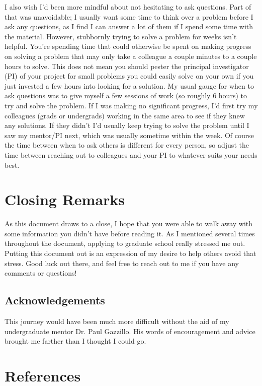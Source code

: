 \documentclass[12pt]{article}
\begin{document}
I also wish I'd been more mindful about not hesitating to ask questions. Part of that was unavoidable; I usually want some time to think over a problem before I ask any questions, as I find I can answer a lot of them if I spend some time with the material. However, stubbornly trying to solve a problem for weeks isn't helpful. You're spending time that could otherwise be spent on making progress on solving a problem that may only take a colleague a couple minutes to a couple hours to solve. This does not mean you should pester the principal investigator (PI) of your project for small problems you could easily solve on your own if you just invested a few hours into looking for a solution. My usual gauge for when to ask questions was to give myself a few sessions of work (so roughly 6 hours) to try and solve the problem. If I was making no significant progress, I'd first try my colleagues (grads or undergrads) working in the same area to see if they knew any solutions. If they didn't I'd usually keep trying to solve the problem until I saw my mentor/PI next, which was usually sometime within the week. Of course the time between when to ask others is different for every person, so adjust the time between reaching out to colleagues and your PI to whatever suits your needs best.

\section{Closing Remarks}

As this document draws to a close, I hope that you were able to walk away with some information you didn't have before reading it. As I mentioned several times throughout the document, applying to graduate school really stressed me out. Putting this document out is an expression of my desire to help others avoid that stress. Good luck out there, and feel free to reach out to me if you have any comments or questions!

\subsection{Acknowledgements}

This journey would have been much more difficult without the aid of my undergraduate mentor Dr. Paul Gazzillo. His words of encouragement and advice brought me farther than I thought I could go.

\section{References}

\printbibliography[heading=none]
\end{document}
